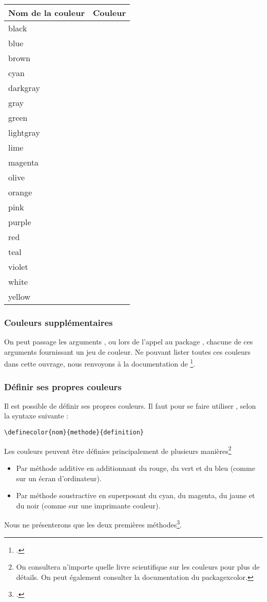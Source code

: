 \newcommand{\exemplecouleur}[1]{#1 & \fcolorbox{black}{#1}{~} \\}

\begin{longtable}{l|l}
	Nom de la couleur 		& Couleur 								\\
	\hline
	\endhead
	\exemplecouleur{black}
	\exemplecouleur{blue}
	\exemplecouleur{brown}
	\exemplecouleur{cyan}
	\exemplecouleur{darkgray}
	\exemplecouleur{gray}
	\exemplecouleur{green}
	\exemplecouleur{lightgray}
	\exemplecouleur{lime}
	\exemplecouleur{magenta}
	\exemplecouleur{olive}
	\exemplecouleur{orange}
	\exemplecouleur{pink}
	\exemplecouleur{purple}
	\exemplecouleur{red}
	\exemplecouleur{teal}
	\exemplecouleur{violet}
	\exemplecouleur{white}
	\exemplecouleur{yellow}
	
\end{longtable}

\subsubsection{Couleurs supplémentaires}

On peut passage les arguments ,  ou  lors de l'appel au package , chacune de ces arguments fournissant un jeu de couleur. Ne pouvant lister toutes ces couleurs dans cette ouvrage, nous renvoyons à la documentation de \footcite{xcolor_jeu}.

\subsubsection{Définir ses propres couleurs}

Il est possible de définir ses propres couleurs. Il faut pour se faire utiliser , selon la syntaxe suivante :

\begin{verbatim}
\definecolor{nom}{methode}{definition}
\end{verbatim}

Les couleurs peuvent être définies principalement de plusieurs manières\footnote{On consultera n'importe quelle livre scientifique sur les couleurs pour plus de détails. On peut également consulter la documentation du package{xcolor}.}
\begin{itemize}
\item Par méthode additive en additionnant du rouge, du vert et du bleu (comme sur un écran d'ordinateur).
\item Par méthode soustractive en superposant du cyan, du magenta, du jaune et du noir (comme sur une imprimante couleur).
\end{itemize}
Nous ne présenterons que les deux premières méthodes\footcite[Il existe aussi la méthode de définition par la longueur d'onde pour les couleurs de l'arc en ciel, par pourcentage de gris pour les différents niveaux de gris, ainsi que par teinte, saturation et luminosité, mais ceci nécessiterait un cours de physique lumineuse. Pour  les personnes intéressés par les détails, consulter][]{xcolor_methode}.

